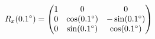 \documentclass[preview]{standalone}
\begin{document}
\begin{align*}
\special{dvisvgm:raw <g id='unique000'>}R_x(0.1^\circ) = \begin{pmatrix} 1 & 0 & 0 \\ 0 & \cos(0.1^\circ) & -\sin(0.1^\circ) \\ 0 & \sin(0.1^\circ) & \cos(0.1^\circ) \end{pmatrix}\special{dvisvgm:raw </g>}
\end{align*}
\end{document}
